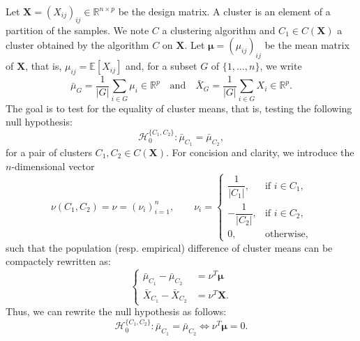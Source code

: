 \documentclass[a4paper,11pt]{article}
\theoremstyle{plain}
\newcommand{\1}{\mathbf{1}}
\begin{document}
Let $\mathbf{X} =(X_{ij})_{ij} \in \mathbb{R}^{n \times p}$ be the design matrix.
A cluster is an element of a partition of the samples.
We note $C$ a clustering algorithm and $C_1 \in C(\mathbf{X})$ a cluster obtained by the algorithm $C$ on $\mathbf{X}$. Let $\boldsymbol{\mu} = (\mu_{ij})_{ij}$ be the mean matrix of $\mathbf{X}$, that is, $\mu_{ij} = \mathbb{E}[X_{ij}]$ and, for a subset $G$ of $\{1,\ldots,n\}$, we write
\begin{equation*}
\bar{\mu}_G = \dfrac{1}{|G|} \displaystyle\sum_{i \in G} \mu_i \in \mathbb{R}^p\quad\text{and}\quad\bar{X}_G = \dfrac{1}{|G|} \displaystyle\sum_{i \in G} X_i \in \mathbb{R}^p.
\end{equation*}
The goal is to test for the equality of cluster means, that is, testing the following null hypothesis: 
\begin{equation}
  \mathcal{H}_0^{\{C_1,C_2\}}: \bar{\mu}_{C_1} = \bar{\mu}_{C_2},
\end{equation}
for a pair of clusters $C_1,C_2\in C(\mathbf{X})$. For concision and clarity, we introduce the $n$-dimensional vector
\begin{equation}\label{nu}
\nu(C_1,C_2)=\nu = (\nu_i)_{i=1}^n, \qquad
\nu_i =
\begin{cases}
\dfrac{1}{|C_1|}, & \text{if } i \in C_1, \\[0.4em]
-\dfrac{1}{|C_2|}, & \text{if } i \in C_2, \\[0.2em]
0, & \text{otherwise},
\end{cases}
\end{equation}
such that the population (resp. empirical) difference of cluster means can be compactely rewritten as:
\begin{equation*}
  \left\{
    \begin{aligned}
      \bar{\mu}_{C_1} - \bar{\mu}_{C_2} &= \nu^T\boldsymbol{\mu} \\
    \bar{X}_{C_1} - \bar{X}_{C_2} &= \nu^T\mathbf{X}.
    \end{aligned}
    \right.
\end{equation*}
Thus, we can rewrite the null hypothesis as follows:
\begin{equation}\label{h0c1c2}
 \mathcal{H}_0^{\{C_1,C_2\}}: \bar{\mu}_{C_1} = \bar{\mu}_{C_2} \iff \nu^T\boldsymbol{\mu} = 0.
\end{equation}
\end{document}
